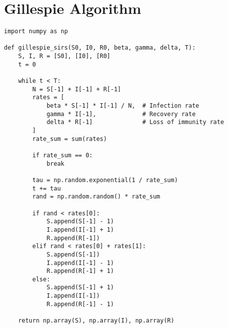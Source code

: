 \section{Gillespie Algorithm}

\begin{lstlisting}[caption=Gillespie Algorithm for SIRS Model, label=lst:gillespie-algorithm]
import numpy as np

def gillespie_sirs(S0, I0, R0, beta, gamma, delta, T):
    S, I, R = [S0], [I0], [R0]
    t = 0

    while t < T:
        N = S[-1] + I[-1] + R[-1]
        rates = [
            beta * S[-1] * I[-1] / N,  # Infection rate
            gamma * I[-1],             # Recovery rate
            delta * R[-1]              # Loss of immunity rate
        ]
        rate_sum = sum(rates)

        if rate_sum == 0:
            break

        tau = np.random.exponential(1 / rate_sum)
        t += tau
        rand = np.random.random() * rate_sum

        if rand < rates[0]:
            S.append(S[-1] - 1)
            I.append(I[-1] + 1)
            R.append(R[-1])
        elif rand < rates[0] + rates[1]:
            S.append(S[-1])
            I.append(I[-1] - 1)
            R.append(R[-1] + 1)
        else:
            S.append(S[-1] + 1)
            I.append(I[-1])
            R.append(R[-1] - 1)

    return np.array(S), np.array(I), np.array(R)
\end{lstlisting}